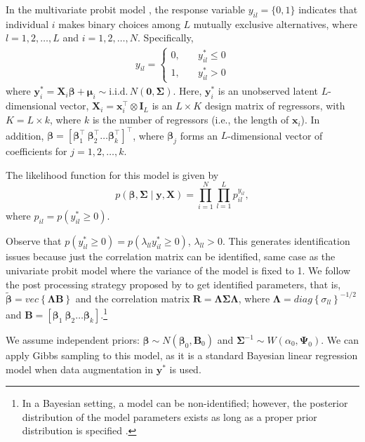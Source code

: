 In the multivariate probit model \cite{Edwards2003}, the response variable \( y_{il} = \{0, 1\} \) indicates that individual \( i \) makes binary choices among \( L \) mutually exclusive alternatives, where \( l = 1, 2, \dots, L \) and \( i = 1, 2, \dots, N \). Specifically, 
\begin{align*}
	y_{il} = \begin{cases}
		0, & \quad y_{il}^* \leq 0 \\
		1, & \quad y_{il}^* > 0
	\end{cases}
\end{align*}
where \( \bm{y}_i^* = \bm{X}_i \bm{\beta} + \bm{\mu}_i \sim \text{i.i.d.} \, N(\bm{0}, \bm{\Sigma}) \). Here, \( \bm{y}_i^* \) is an unobserved latent \( L \)-dimensional vector, \( \bm{X}_i = \bm{x}_i^\top \otimes \bm{I}_L \) is an \( L \times K \) design matrix of regressors, with \( K = L \times k \), where \( k \) is the number of regressors (i.e., the length of \( \bm{x}_i \)). In addition, \( \bm{\beta} = \left[\bm{\beta}_1^\top \ \bm{\beta}_2^\top \dots \bm{\beta}_k^\top\right]^\top \), where \( \bm{\beta}_j \) forms an \( L \)-dimensional vector of coefficients for \( j = 1, 2, \dots, k \).

The likelihood function for this model is given by 
\[
p(\bm{\beta}, \bm{\Sigma} \mid \bm{y}, \bm{X}) = \prod_{i=1}^N \prod_{l=1}^L p_{il}^{y_{il}},
\]
where \( p_{il} = p(y_{il}^* \geq 0) \).

Observe that $p({y}_{il}^*\geq 0)=p({\lambda}_{ll}{y}_{il}^*\geq 0)$, $\lambda_{ll}>0$. This generates identification issues because just the correlation matrix can be identified, same case as the univariate probit model where the variance of the model is fixed to 1. We follow the post processing strategy proposed by \cite{Edwards2003} to get identified parameters, that is, $\tilde{\bm{\beta}}=vec\left\{\bm{\Lambda}\bm{B}\right\}$ and the correlation matrix $\bm{R}=\bm{\Lambda}\bm{\Sigma}\bm{\Lambda}$, where $\bm{\Lambda}=diag\left\{\sigma_{ll}\right\}^{-1/2}$ and $\bm{B}=\left[\bm{\beta}_1 \ \bm{\beta}_2\dots \bm{\beta}_k\right]$.\footnote{In a Bayesian setting, a model can be non-identified; however, the posterior distribution of the model parameters exists as long as a proper prior distribution is specified \cite{Edwards2003}.}

We assume independent priors: $\bm{\beta} \sim N(\bm{\beta}_0, \bm{B}_0)$ and $\bm{\Sigma}^{-1} \sim W(\alpha_0, \bm{\Psi}_0)$. We can apply Gibbs sampling to this model, as it is a standard Bayesian linear regression model when data augmentation in $\bm{y}^*$ is used.

